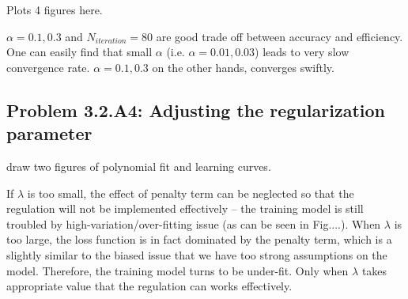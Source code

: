 \documentclass[english,11pt]{article}
\begin{document}
Plots 4 figures here.

$\alpha = 0.1, 0.3$ and $N_{iteration} = 80$ are good trade off between accuracy and efficiency. One can easily find that small $\alpha$ (i.e. $\alpha= 0.01, 0.03$) leads to very slow convergence rate. $\alpha =0.1,0.3$ on the other hands, converges swiftly.

\subsection*{Problem 3.2.A4: Adjusting the regularization parameter}
draw two figures of polynomial fit and learning curves.

If $\lambda$ is too small, the effect of penalty term can be neglected so that the regulation will not be implemented effectively -- the training model is still troubled by high-variation/over-fitting issue (as can be seen in Fig....). When $\lambda$ is too large, the loss function is in fact dominated by the penalty term, which is a slightly similar to the biased issue that we have too strong assumptions on the model. Therefore, the training model turns to be under-fit.  Only when $\lambda$ takes appropriate value that the regulation can works effectively.
\end{document}
